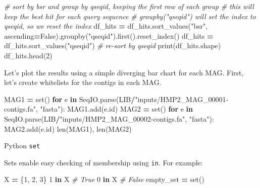 \documentclass[
]{book}
\newenvironment{Shaded}{\begin{snugshade}}{\end{snugshade}}
\newcommand{\BuiltInTok}[1]{#1}
\newcommand{\CommentTok}[1]{\textcolor[rgb]{0.56,0.35,0.01}{\textit{#1}}}
\newcommand{\ControlFlowTok}[1]{\textcolor[rgb]{0.13,0.29,0.53}{\textbf{#1}}}
\newcommand{\DecValTok}[1]{\textcolor[rgb]{0.00,0.00,0.81}{#1}}
\newcommand{\KeywordTok}[1]{\textcolor[rgb]{0.13,0.29,0.53}{\textbf{#1}}}
\newcommand{\NormalTok}[1]{#1}
\newcommand{\OperatorTok}[1]{\textcolor[rgb]{0.81,0.36,0.00}{\textbf{#1}}}
\newcommand{\StringTok}[1]{\textcolor[rgb]{0.31,0.60,0.02}{#1}}
\newcommand{\VariableTok}[1]{\textcolor[rgb]{0.00,0.00,0.00}{#1}}
\begin{document}
\begin{Shaded}
\begin{Highlighting}[numbers=left,,]
\CommentTok{\# sort by bsr and group by qseqid, keeping the first row of each group}
\CommentTok{\# this will keep the best hit for each query sequence}
\CommentTok{\# groupby("qseqid") will set the index to qseqid, so we reset the index}
\NormalTok{df\_hits }\OperatorTok{=}\NormalTok{ df\_hits.sort\_values(}\StringTok{"bsr"}\NormalTok{, ascending}\OperatorTok{=}\VariableTok{False}\NormalTok{).groupby(}\StringTok{"qseqid"}\NormalTok{).first().reset\_index()}
\NormalTok{df\_hits }\OperatorTok{=}\NormalTok{ df\_hits.sort\_values(}\StringTok{"qseqid"}\NormalTok{) }\CommentTok{\# re{-}sort by qseqid}
\BuiltInTok{print}\NormalTok{(df\_hits.shape)}
\NormalTok{df\_hits.head(}\DecValTok{2}\NormalTok{)}
\end{Highlighting}
\end{Shaded}

Let's plot the results using a simple diverging bar chart for each MAG. First, let's create whitelists for the contigs in each MAG.

\begin{Shaded}
\begin{Highlighting}[numbers=left,,]
\NormalTok{MAG1 }\OperatorTok{=} \BuiltInTok{set}\NormalTok{()}
\ControlFlowTok{for}\NormalTok{ e }\KeywordTok{in}\NormalTok{ SeqIO.parse(LIB}\OperatorTok{/}\StringTok{"inputs/HMP2\_MAG\_00001{-}contigs.fa"}\NormalTok{, }\StringTok{"fasta"}\NormalTok{):}
\NormalTok{    MAG1.add(e.}\BuiltInTok{id}\NormalTok{)}
\NormalTok{MAG2 }\OperatorTok{=} \BuiltInTok{set}\NormalTok{()}
\ControlFlowTok{for}\NormalTok{ e }\KeywordTok{in}\NormalTok{ SeqIO.parse(LIB}\OperatorTok{/}\StringTok{"inputs/HMP2\_MAG\_00002{-}contigs.fa"}\NormalTok{, }\StringTok{"fasta"}\NormalTok{):}
\NormalTok{    MAG2.add(e.}\BuiltInTok{id}\NormalTok{)}
\BuiltInTok{len}\NormalTok{(MAG1), }\BuiltInTok{len}\NormalTok{(MAG2)}
\end{Highlighting}
\end{Shaded}

Python \texttt{set}

Sets enable easy checking of membership using \texttt{in}. For example:

\begin{Shaded}
\begin{Highlighting}[numbers=left,,]
\NormalTok{X }\OperatorTok{=}\NormalTok{ \{}\DecValTok{1}\NormalTok{, }\DecValTok{2}\NormalTok{, }\DecValTok{3}\NormalTok{\}}
\DecValTok{1} \KeywordTok{in}\NormalTok{ X }\CommentTok{\# True}
\DecValTok{0} \KeywordTok{in}\NormalTok{ X }\CommentTok{\# False}
\NormalTok{empty\_set }\OperatorTok{=} \BuiltInTok{set}\NormalTok{()}
\end{Highlighting}
\end{Shaded}
\end{document}
